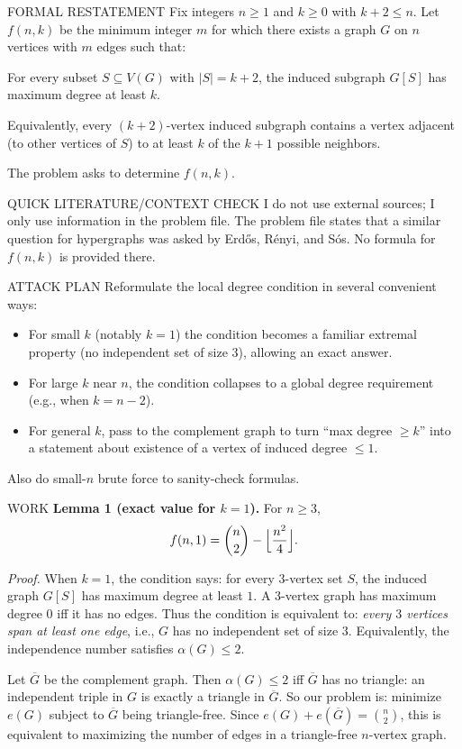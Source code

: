 
FORMAL RESTATEMENT
Fix integers $n\ge 1$ and $k\ge 0$ with $k+2\le n$.
Let $f(n,k)$ be the minimum integer $m$ for which there exists a graph $G$ on $n$
vertices with $m$ edges such that:

\medskip
\noindent For every subset $S\subseteq V(G)$ with $|S|=k+2$, the induced subgraph
$G[S]$ has maximum degree at least $k$.

Equivalently, every $(k+2)$-vertex induced subgraph contains a vertex adjacent
(to other vertices of $S$) to at least $k$ of the $k+1$ possible neighbors.

The problem asks to determine $f(n,k)$.

QUICK LITERATURE/CONTEXT CHECK
I do not use external sources; I only use information in the problem file.
The problem file states that a similar question for hypergraphs was asked by
Erd\H{o}s, R\'enyi, and S\'os.
No formula for $f(n,k)$ is provided there.

ATTACK PLAN
Reformulate the local degree condition in several convenient ways:
\begin{itemize}
\item For small $k$ (notably $k=1$) the condition becomes a familiar extremal
property (no independent set of size $3$), allowing an exact answer.
\item For large $k$ near $n$, the condition collapses to a global degree
requirement (e.g., when $k=n-2$).
\item For general $k$, pass to the complement graph to turn ``max degree $\ge k$''
into a statement about existence of a vertex of induced degree $\le1$.
\end{itemize}
Also do small-$n$ brute force to sanity-check formulas.

WORK
\textbf{Lemma 1 (exact value for $k=1$).}
For $n\ge 3$,
\[
 f(n,1)=\binom{n}{2}-\Bigl\lfloor\frac{n^2}{4}\Bigr\rfloor.
\]

\emph{Proof.}
When $k=1$, the condition says:
for every $3$-vertex set $S$, the induced graph $G[S]$ has maximum degree at
least $1$. A $3$-vertex graph has maximum degree $0$ iff it has no edges.
Thus the condition is equivalent to: \emph{every $3$ vertices span at least one
edge}, i.e., $G$ has no independent set of size $3$.
Equivalently, the independence number satisfies $\alpha(G)\le2$.

Let $\overline{G}$ be the complement graph. Then $\alpha(G)\le2$ iff
$\overline{G}$ has no triangle: an independent triple in $G$ is exactly a
triangle in $\overline{G}$.
So our problem is:
minimize $e(G)$ subject to $\overline{G}$ being triangle-free.
Since $e(G)+e(\overline{G})=\binom{n}{2}$, this is equivalent to maximizing the
number of edges in a triangle-free $n$-vertex graph.

